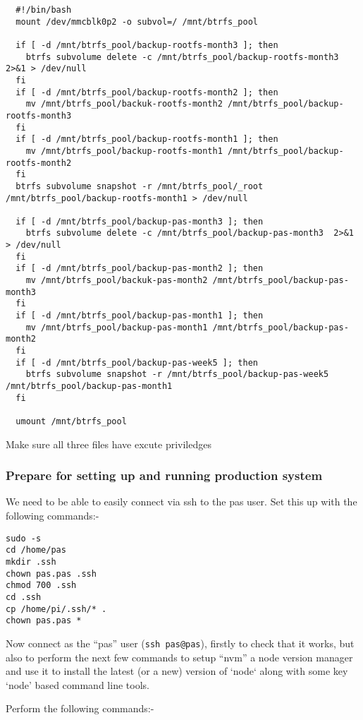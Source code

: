 \documentclass[Draft]{akc}
\begin{document}
\begin{lstlisting}
  #!/bin/bash
  mount /dev/mmcblk0p2 -o subvol=/ /mnt/btrfs_pool

  if [ -d /mnt/btrfs_pool/backup-rootfs-month3 ]; then
    btrfs subvolume delete -c /mnt/btrfs_pool/backup-rootfs-month3 2>&1 > /dev/null
  fi
  if [ -d /mnt/btrfs_pool/backup-rootfs-month2 ]; then
    mv /mnt/btrfs_pool/backuk-rootfs-month2 /mnt/btrfs_pool/backup-rootfs-month3
  fi
  if [ -d /mnt/btrfs_pool/backup-rootfs-month1 ]; then
    mv /mnt/btrfs_pool/backup-rootfs-month1 /mnt/btrfs_pool/backup-rootfs-month2
  fi
  btrfs subvolume snapshot -r /mnt/btrfs_pool/_root /mnt/btrfs_pool/backup-rootfs-month1 > /dev/null

  if [ -d /mnt/btrfs_pool/backup-pas-month3 ]; then
    btrfs subvolume delete -c /mnt/btrfs_pool/backup-pas-month3  2>&1 > /dev/null
  fi
  if [ -d /mnt/btrfs_pool/backup-pas-month2 ]; then
    mv /mnt/btrfs_pool/backuk-pas-month2 /mnt/btrfs_pool/backup-pas-month3
  fi
  if [ -d /mnt/btrfs_pool/backup-pas-month1 ]; then
    mv /mnt/btrfs_pool/backup-pas-month1 /mnt/btrfs_pool/backup-pas-month2
  fi
  if [ -d /mnt/btrfs_pool/backup-pas-week5 ]; then
    btrfs subvolume snapshot -r /mnt/btrfs_pool/backup-pas-week5 /mnt/btrfs_pool/backup-pas-month1
  fi

  umount /mnt/btrfs_pool

\end{lstlisting}

Make sure all three files have excute priviledges


\subsubsection{Prepare for setting up and running production system}

We need to be able to easily connect via ssh to the pas user.  Set this up with
the following commands:-

\begin{lstlisting}
sudo -s
cd /home/pas
mkdir .ssh
chown pas.pas .ssh
chmod 700 .ssh
cd .ssh
cp /home/pi/.ssh/* .
chown pas.pas *
\end{lstlisting}

Now connect as the ``pas'' user (\texttt{ssh pas@pas}), firstly to check that it works, but also
to perform the next few commands to setup ``nvm'' a node version manager and use it to install the latest
(or a new) version of `node` along with some key `node' based command line tools.

Perform the following commands:-
\end{document}
